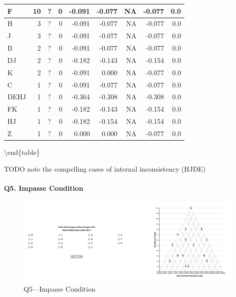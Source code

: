 \documentclass[
  letterpaper,
  DIV=11,
  numbers=noendperiod]{scrreprt}
\let\oldparagraph\paragraph
\renewcommand{\paragraph}[1]{\oldparagraph{#1}\mbox{}}
\begin{document}
\begin{tabular}[t]{l|r|l|r|r|r|r|r|r}
\hline
\hspace{1em}F & 10 & ? & 0 & -0.091 & -0.077 & NA & -0.077 & 0.0\\
\hline
\hspace{1em}H & 3 & ? & 0 & -0.091 & -0.077 & NA & -0.077 & 0.0\\
\hline
\hspace{1em}J & 3 & ? & 0 & -0.091 & -0.077 & NA & -0.077 & 0.0\\
\hline
\hspace{1em}B & 2 & ? & 0 & -0.091 & -0.077 & NA & -0.077 & 0.0\\
\hline
\hspace{1em}DJ & 2 & ? & 0 & -0.182 & -0.143 & NA & -0.154 & 0.0\\
\hline
\hspace{1em}K & 2 & ? & 0 & -0.091 & 0.000 & NA & -0.077 & 0.0\\
\hline
\hspace{1em}C & 1 & ? & 0 & -0.091 & -0.077 & NA & -0.077 & 0.0\\
\hline
\hspace{1em}DEHJ & 1 & ? & 0 & -0.364 & -0.308 & NA & -0.308 & 0.0\\
\hline
\hspace{1em}FK & 1 & ? & 0 & -0.182 & -0.143 & NA & -0.154 & 0.0\\
\hline
\hspace{1em}HJ & 1 & ? & 0 & -0.182 & -0.154 & NA & -0.154 & 0.0\\
\hline
\hspace{1em}Z & 1 & ? & 0 & 0.000 & 0.000 & NA & -0.077 & 0.0\\
\hline
\end{tabular}

\textbackslash end\{table\}

TODO note the compelling cases of internal inconsistency (HJDE)

\hypertarget{q5.-impasse-condition}{%
\paragraph{Q5. Impasse Condition}\label{q5.-impasse-condition}}

\begin{figure}

{\centering \includegraphics{analysis/SGC3A/static/questions/Q5_121.png}

}

\caption{\label{fig-Q5-121}Q5---Impasse Condition}

\end{figure}
\end{document}
